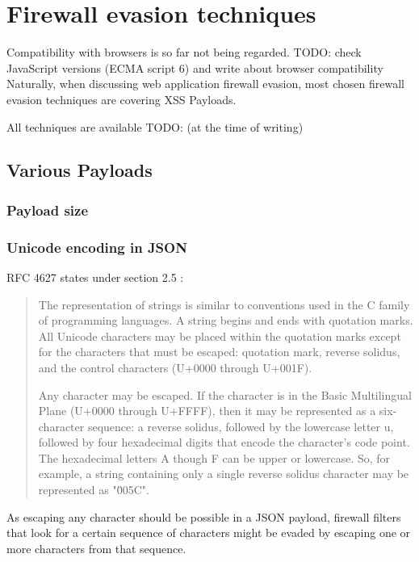 \section{Firewall evasion techniques}

{\color{red} Compatibility with browsers is so far not being regarded. TODO: check JavaScript versions (ECMA script 6) and write about browser compatibility}
Naturally, when discussing web application firewall evasion, most chosen firewall evasion techniques are covering XSS Payloads.

All techniques are available {\color{red} TODO: (at the time of writing)}

\subsection{Various Payloads}

\subsubsection{Payload size}

\subsubsection{Unicode encoding in JSON}
RFC 4627  states under section 2.5 :
\begin{quote}
	The representation of strings is similar to conventions used in the C
	family of programming languages.  A string begins and ends with
	quotation marks.  All Unicode characters may be placed within the
	quotation marks except for the characters that must be escaped:
	quotation mark, reverse solidus, and the control characters (U+0000
	through U+001F).

	Any character may be escaped.  If the character is in the Basic
	Multilingual Plane (U+0000 through U+FFFF), then it may be
	represented as a six-character sequence: a reverse solidus, followed
	by the lowercase letter u, followed by four hexadecimal digits that
	encode the character's code point.  The hexadecimal letters A though
	F can be upper or lowercase.  So, for example, a string containing
	only a single reverse solidus character may be represented as
	"\u005C". \cite{rfc4627}
\end{quote}
As escaping any character should be possible in a JSON payload, firewall filters that look for a certain sequence of characters might be evaded by escaping one or more characters from that sequence.



